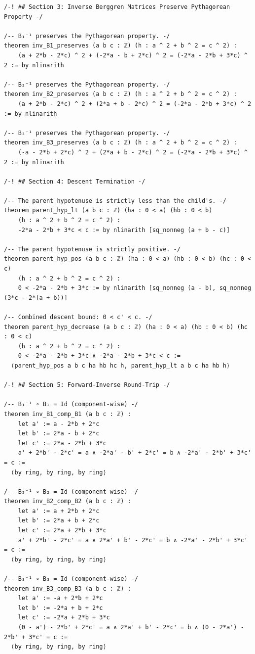 \documentclass[11pt,openany]{book}
\theoremstyle{definition}
\theoremstyle{plain}
\theoremstyle{remark}
\begin{document}
\begin{lstlisting}[style=lean]
/-! ## Section 3: Inverse Berggren Matrices Preserve Pythagorean Property -/

/-- B₁⁻¹ preserves the Pythagorean property. -/
theorem inv_B1_preserves (a b c : ℤ) (h : a ^ 2 + b ^ 2 = c ^ 2) :
    (a + 2*b - 2*c) ^ 2 + (-2*a - b + 2*c) ^ 2 = (-2*a - 2*b + 3*c) ^ 2 := by nlinarith

/-- B₂⁻¹ preserves the Pythagorean property. -/
theorem inv_B2_preserves (a b c : ℤ) (h : a ^ 2 + b ^ 2 = c ^ 2) :
    (a + 2*b - 2*c) ^ 2 + (2*a + b - 2*c) ^ 2 = (-2*a - 2*b + 3*c) ^ 2 := by nlinarith

/-- B₃⁻¹ preserves the Pythagorean property. -/
theorem inv_B3_preserves (a b c : ℤ) (h : a ^ 2 + b ^ 2 = c ^ 2) :
    (-a - 2*b + 2*c) ^ 2 + (2*a + b - 2*c) ^ 2 = (-2*a - 2*b + 3*c) ^ 2 := by nlinarith

/-! ## Section 4: Descent Termination -/

/-- The parent hypotenuse is strictly less than the child's. -/
theorem parent_hyp_lt (a b c : ℤ) (ha : 0 < a) (hb : 0 < b)
    (h : a ^ 2 + b ^ 2 = c ^ 2) :
    -2*a - 2*b + 3*c < c := by nlinarith [sq_nonneg (a + b - c)]

/-- The parent hypotenuse is strictly positive. -/
theorem parent_hyp_pos (a b c : ℤ) (ha : 0 < a) (hb : 0 < b) (hc : 0 < c)
    (h : a ^ 2 + b ^ 2 = c ^ 2) :
    0 < -2*a - 2*b + 3*c := by nlinarith [sq_nonneg (a - b), sq_nonneg (3*c - 2*(a + b))]

/-- Combined descent bound: 0 < c' < c. -/
theorem parent_hyp_decrease (a b c : ℤ) (ha : 0 < a) (hb : 0 < b) (hc : 0 < c)
    (h : a ^ 2 + b ^ 2 = c ^ 2) :
    0 < -2*a - 2*b + 3*c ∧ -2*a - 2*b + 3*c < c :=
  ⟨parent_hyp_pos a b c ha hb hc h, parent_hyp_lt a b c ha hb h⟩

/-! ## Section 5: Forward-Inverse Round-Trip -/

/-- B₁⁻¹ ∘ B₁ = Id (component-wise) -/
theorem inv_B1_comp_B1 (a b c : ℤ) :
    let a' := a - 2*b + 2*c
    let b' := 2*a - b + 2*c
    let c' := 2*a - 2*b + 3*c
    a' + 2*b' - 2*c' = a ∧ -2*a' - b' + 2*c' = b ∧ -2*a' - 2*b' + 3*c' = c :=
  ⟨by ring, by ring, by ring⟩

/-- B₂⁻¹ ∘ B₂ = Id (component-wise) -/
theorem inv_B2_comp_B2 (a b c : ℤ) :
    let a' := a + 2*b + 2*c
    let b' := 2*a + b + 2*c
    let c' := 2*a + 2*b + 3*c
    a' + 2*b' - 2*c' = a ∧ 2*a' + b' - 2*c' = b ∧ -2*a' - 2*b' + 3*c' = c :=
  ⟨by ring, by ring, by ring⟩

/-- B₃⁻¹ ∘ B₃ = Id (component-wise) -/
theorem inv_B3_comp_B3 (a b c : ℤ) :
    let a' := -a + 2*b + 2*c
    let b' := -2*a + b + 2*c
    let c' := -2*a + 2*b + 3*c
    (0 - a') - 2*b' + 2*c' = a ∧ 2*a' + b' - 2*c' = b ∧ (0 - 2*a') - 2*b' + 3*c' = c :=
  ⟨by ring, by ring, by ring⟩


\end{lstlisting}
\end{document}

